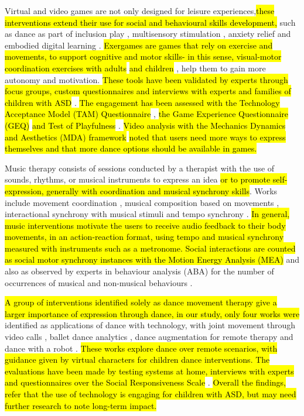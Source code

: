 \documentclass[a4paper,fleqn]{cas-sc}
\begin{document}
Virtual and video games are not only designed for leisure experiences,\hl{these interventions extend their use for social and behavioural skills development,} such as dance as part of inclusion play \cite{Wasserman19}, multisensory stimulation \cite{Castelhano17}, anxiety relief\cite{AltizerJr18} and embodied digital learning \cite{Martinez-Mones19}. \hl{Exergames are games that rely on exercise and movements, to support cognitive and motor skills- in this sense, visual-motor coordination exercises with adults} \cite{Caro18} \hl{and children} \cite{Raygoza-Romero21}, help them to gain more autonomy and motivation. \hl{These tools have been validated by experts through focus groups, custom questionnaires and interviews with experts and families of children with ASD} \cite{AltizerJr18, Crowell18, Caro17}. \hl{The engagement has been assessed with the Technology Acceptance Model (TAM) Questionnaire} \cite{Raygoza-Romero21, Vargas20}, \hl{the Game Experience Questionnaire (GEQ)} \cite{Caro18} \hl{and Test of Playfulness} \cite{Castelhano17}. \hl{Video analysis with the Mechanics Dynamics and Aesthetics (MDA) framework} \cite{Wasserman19} \hl{noted that users need more ways to express themselves and that more dance options should be available in games.}

Music therapy consists of sessions conducted by a therapist with the use of sounds, rhythms, or musical instruments to express an idea \hl{or to promote self-expression, generally with coordination and musical synchrony skills}. Works include movement coordination \cite{Ragone22, Vargas20}, musical composition based on movements \cite{Ragone20OS, Ma21}, interactional synchrony with musical stimuli \cite{Mcgowan21, McGowan17} and tempo synchrony \cite{Yi-Hsiang18}. \hl{In general, music interventions motivate the users to receive audio feedback to their body movements, in an action-reaction format, using tempo and musical synchrony measured with instruments such as a metronome}\cite{Yi-Hsiang18}\hl{. Social interactions are counted as social motor synchrony instances with the Motion Energy Analysis (MEA)} \cite{Ragone22, Ragone20OS} and also as observed by experts in behaviour analysis (ABA) for the number of occurrences of musical and non-musical behaviours \cite{Mcgowan21, McGowan17}. 


\hl{A group of interventions identified solely as dance movement therapy give a larger importance of expression through dance, in our study, only four works were} identified as applications of dance with technology, with joint movement through video calls \cite{Brown22}, ballet dance analytics \cite{Trajkova20}, dance augmentation for remote therapy \cite{Ringland19} and dance with a robot \cite{Suzuki17}. \hl{These works explore dance over remote scenarios, with guidance given by virtual characters for children dance interventions. The evaluations have been made by testing systems at home, interviews with experts} \cite{Ringland19} \hl{and questionnaires over the Social Responsiveness Scale} \cite{Suzuki17}. \hl{Overall the findings, refer that the use of technology is engaging for children with ASD, but may need further research to note long-term impact.}
\end{document}
